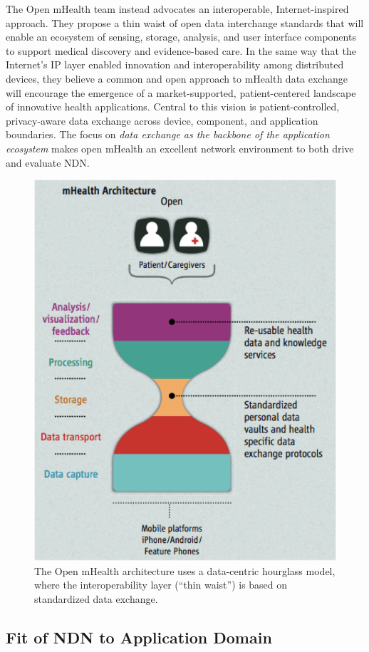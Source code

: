 The Open mHealth team instead advocates an interoperable,  Internet-inspired
approach. They propose a thin waist of open data interchange standards
that will enable an ecosystem of sensing, storage, analysis, and user
interface components to support medical
discovery and evidence-based care.  In the same way that the Internet's
IP layer enabled innovation and interoperability among distributed
devices, they believe a common and open approach to mHealth data exchange
will  encourage the emergence of a market-supported, patient-centered
landscape of innovative health applications. Central to this vision is
patient-controlled, privacy-aware data exchange across device, component,
and application boundaries.  The focus on \emph{data exchange as the
backbone of the application ecosystem} makes open mHealth an excellent
network environment to both drive and evaluate NDN.

\begin{figure}
\begin{center}
\includegraphics[width=.4\textwidth]{figures/mHealth-hourglass}
\caption{The Open mHealth architecture uses a data-centric hourglass model, where the interoperability layer (``thin waist'') is based on standardized data exchange.~\cite{SimEstrin2010}}
\label{fig:mHealth}
\end{center}
\end{figure}

\subsection{Fit of NDN to Application Domain}

